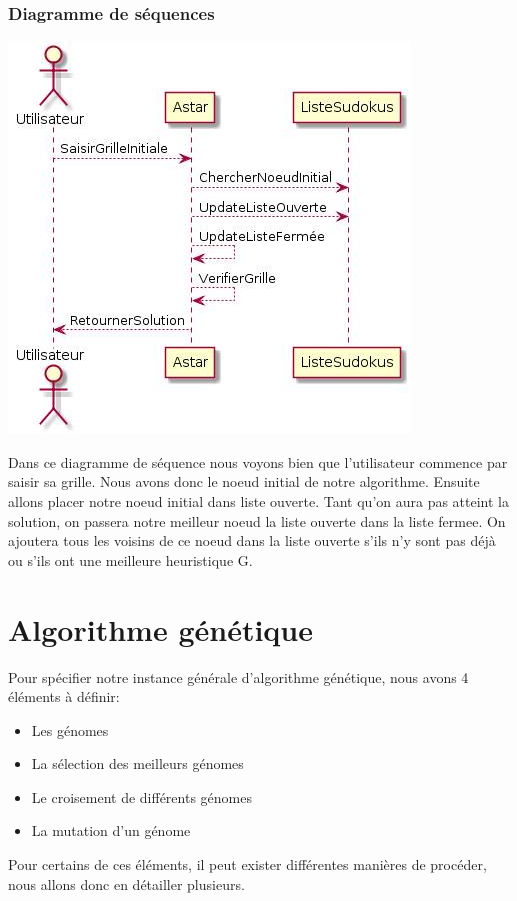             \subsubsection{Diagramme de séquences}
                \begin{center}
                    \includegraphics[scale=0.5]{images/AstarDiagrammeSequences.png}
                \end{center}
                Dans ce diagramme de séquence nous voyons bien que l'utilisateur commence par saisir sa grille. Nous avons donc le noeud initial de notre algorithme. Ensuite allons placer notre noeud initial dans liste ouverte. Tant qu'on aura pas atteint la solution, on passera notre meilleur noeud la liste ouverte dans la liste fermee. On ajoutera tous les voisins de ce noeud dans la liste ouverte s'ils n'y sont pas déjà ou s'ils ont une meilleure heuristique G.  
    \section{Algorithme génétique}
        Pour spécifier notre instance générale d'algorithme génétique, nous avons 4 éléments à définir:
        \begin{itemize}
            \item Les génomes
            \item La sélection des meilleurs génomes
            \item Le croisement de différents génomes
            \item La mutation d'un génome
        \end{itemize}
        Pour certains de ces éléments, il peut exister différentes manières de procéder, nous allons donc en détailler plusieurs.
